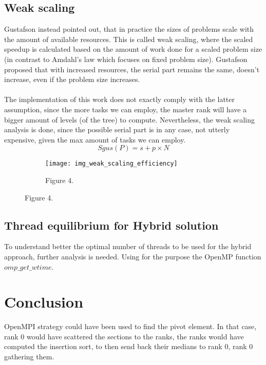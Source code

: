 \documentclass[11pt]{article}
\newcommand{\plotheight}{0.425}
\newcommand{\plotwidth}{0.7}
\begin{document}
\subsection{Weak scaling}
Gustafson instead pointed out, that in practice the sizes of problems scale with the amount of available resources.
This is called weak scaling, where the scaled speedup is calculated based on the amount of work done for a scaled problem size (in contrast to Amdahl’s law which focuses on fixed problem size). Gustafson proposed that with increased resources, the serial part remains the same, doesn't increase, even if the problem size increases.\\\\The implementation of this work does not exactly comply with the latter assumption, since the more tasks we can employ, the master rank will have a bigger amount of levels (of the tree) to compute. Nevertheless, the weak scaling analysis is done, since the possible serial part is in any case, not utterly expensive, given the max amount of tasks we can employ.
\begin{equation} \label{eqn}
	Sgus(P) = {s + p × N} 
\end{equation}
\begin{figure}[H]
    \centering
\begin{subfigure}{\plotwidth\textwidth}
        \centering
\texttt{[image: img\_weak\_scaling\_efficiency]}
\caption{Figure 4.}
\end{subfigure}
\end{figure}
\subsection{Thread equilibrium for Hybrid solution}
To understand better the optimal number of threads to be used for the hybrid approach, further analysis is needed.
Using for the purpose the OpenMP function $omp\_get\_wtime$.
\section{Conclusion}
OpenMPI strategy could have been used to find the pivot element. In that case, rank 0 would have scattered the sections to the ranks, the ranks would have computed the insertion sort, to then send back their medians to rank 0, rank 0 gathering them.
\end{document}

